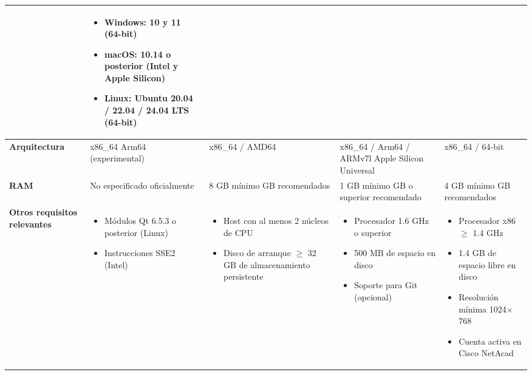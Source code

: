 \documentclass[11.5pt]{article}
\begin{document}
\begin{table}[H]
\begin{tabularx}{\textwidth}{|l|X|X|X|X|}
\begin{itemize}[leftmargin=*,nosep,topsep=0pt]
			\end{itemize} & 
			\begin{itemize}[leftmargin=*,nosep,topsep=0pt]
				\item \textbf{Windows}: 10 y 11 (64-bit)
				\item \textbf{macOS}: 10.14 o posterior (Intel y Apple Silicon)
				\item \textbf{Linux}: Ubuntu 20.04 / 22.04 / 24.04 LTS (64-bit)
			\end{itemize} \\
			\hline
			\textbf{Arquitectura} & 
			x86\_64 \newline Arm64 (experimental) & 
			x86\_64 / AMD64 & 
			x86\_64 / Arm64 / ARMv7l \newline Apple Silicon Universal & 
			x86\_64 / 64-bit \\
			\hline
			\textbf{RAM} & 
			No especificado oficialmente & 
			8 GB mínimo \newline 12 GB recomendados & 
			1 GB mínimo \newline 4 GB o superior recomendado & 
			4 GB mínimo \newline 8 GB recomendados \\
			\hline
			\textbf{Otros requisitos relevantes} & 
			\begin{itemize}[leftmargin=*,nosep,topsep=0pt]
				\item Módulos Qt 6.5.3 o posterior (Linux)
				\item Instrucciones SSE2 (Intel)
			\end{itemize} & 
			\begin{itemize}[leftmargin=*,nosep,topsep=0pt]
				\item Host con al menos 2 núcleos de CPU
				\item Disco de arranque $\geq$ 32 GB de almacenamiento persistente
			\end{itemize} & 
			\begin{itemize}[leftmargin=*,nosep,topsep=0pt]
				\item Procesador 1.6 GHz o superior
				\item 500 MB de espacio en disco
				\item Soporte para Git (opcional)
			\end{itemize} & 
			\begin{itemize}[leftmargin=*,nosep,topsep=0pt]
				\item Procesador x86 $\geq$ 1.4 GHz
				\item 1.4 GB de espacio libre en disco
				\item Resolución mínima 1024$\times$768
				\item Cuenta activa en Cisco NetAcad
			\end{itemize} \\
			\hline
		\end{tabularx}
	\end{table}
	
\end{document}
